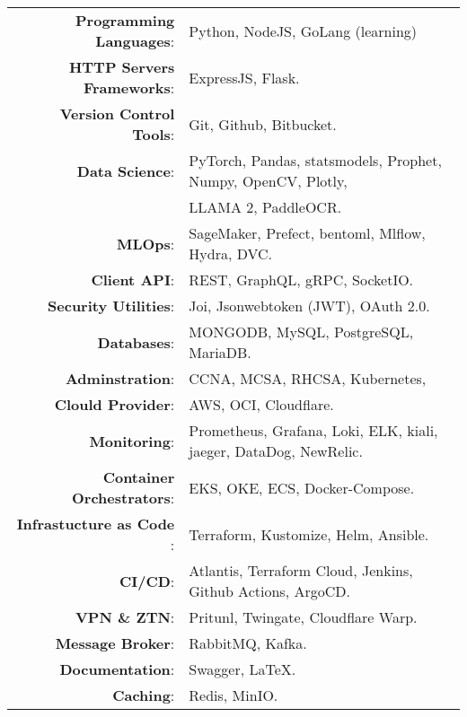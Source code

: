 \documentclass[a4paper,10pt]{article}
\begin{document}
\begin{longtable}{r p{16cm}}	
    \textbf{Programming Languages}:& Python, NodeJS, GoLang (learning)\\
    \textbf{HTTP Servers Frameworks}:& ExpressJS, Flask.\\
    \textbf{Version Control Tools}:& Git, Github, Bitbucket.\\
    \textbf{Data Science}:& PyTorch, Pandas, statsmodels, Prophet, Numpy, OpenCV, Plotly,\\
    & LLAMA 2, PaddleOCR.\\
    \textbf{MLOps}:& SageMaker, Prefect, bentoml, Mlflow, Hydra, DVC.\\
    \textbf{Client API}:& REST, GraphQL, gRPC, SocketIO.\\
    \textbf{Security Utilities}:& Joi, Jsonwebtoken (JWT), OAuth 2.0.\\ 
    \textbf{Databases}:& MONGODB, MySQL, PostgreSQL, MariaDB.\\
    \textbf{Adminstration}:& CCNA, MCSA, RHCSA, Kubernetes,\\
    \textbf{Clould Provider}:& AWS, OCI, Cloudflare. \\
    \textbf{Monitoring}:& Prometheus, Grafana, Loki, ELK, kiali, jaeger, DataDog, NewRelic.\\ 
    \textbf{Container Orchestrators}:& EKS, OKE, ECS, Docker-Compose. \\
    \textbf{Infrastucture as Code }:& Terraform, Kustomize, Helm, Ansible.\\
    \textbf{CI/CD}:& Atlantis, Terraform Cloud, Jenkins, Github Actions, ArgoCD.\\
    \textbf{VPN \& ZTN}:& Pritunl, Twingate, Cloudflare Warp. \\
    \textbf{Message Broker}:& RabbitMQ, Kafka.\\
    \textbf{Documentation}:& Swagger, \LaTeX.\\
    \textbf{Caching}:& Redis, MinIO.\\
\end{longtable}
\end{document}
